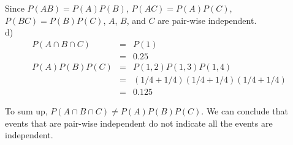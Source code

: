 \documentclass[12pt]{article}
\begin{document}
Since $P(AB) = P(A)P(B)$, $P(AC) = P(A)P(C)$, $P(BC) = P(B)P(C)$, $A$, $B$, and $C$ are pair-wise independent. \\

d)
\begin{eqnarray*}
P(A \cap B \cap C)
&=& P({1}) \\
&=& 0.25 \\
P(A)P(B)P(C)
&=& P({1,2})P({1,3})P({1,4}) \\
&=& (1/4 + 1/4)(1/4 + 1/4)(1/4 + 1/4) \\
&=& 0.125
\end{eqnarray*}

To sum up, $P(A \cap B \cap C) \neq P(A)P(B)P(C)$. We can conclude that events that are pair-wise independent do not indicate all the events are independent.
\end{document}
